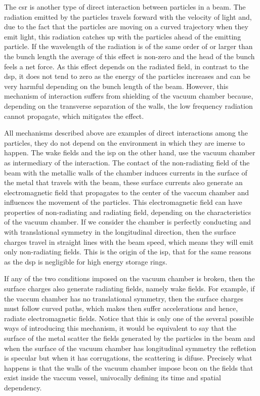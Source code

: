 \documentclass[
	12pt,				%
	openright,			%
	oneside,			%
	a4paper,		%
	chapter=TITLE,		%
	section=TITLE,		%
    brazil,				%
	english,			%
	sumario=tradicional,
	]{abntex2}
\begin{document}
  The \gls{csr} is another type of direct interaction between particles in a beam. The radiation emitted by the particles travels forward with the velocity of light and, due to the fact that the particles are moving on a curved trajectory when they emit light, this radiation catches up with the particles ahead of the emitting particle. If the wavelength of the radiation is of the same order of or larger than the bunch length the average of this effect is non-zero and the head of the bunch feels a net force. As this effect depends on the radiated field, in contrast to the \gls{dsp}, it does not tend to zero as the energy of the particles increases and can be very harmful depending on the bunch length of the beam. However, this mechanism of interaction suffers from shielding of the vacuum chamber because, depending on the transverse separation of the walls, the low frequency radiation cannot propagate, which mitigates the effect.

  All mechanisms described above are examples of direct interactions among the particles, they do not depend on the environment in which they are imerse to happen. The wake fields and the \gls{isp} on the other hand, use the vacuum chamber as intermediary of the interaction. The contact of the non-radiating field of the beam with the metallic walls of the chamber induces currents in the surface of the metal that travels with the beam, these surface currents also generate an electromagnetic field that propagates to the center of the vaccum chamber and influences the movement of the particles. This electromagnetic field can have properties of non-radiating and radiating field, depending on the characteristics of the vacuum chamber. If we consider the chamber is perfectly conducting and with translational symmetry in the longitudinal direction, then the surface charges travel in straight lines with the beam speed, which means they will emit only non-radiating fields. This is the origin of the \gls{isp}, that for the same reasons as the \gls{dsp} is negligible for high energy storage rings.

  If any of the two conditions imposed on the vacuum chamber is broken, then the surface charges also generate radiating fields, namely wake fields. For example, if the vaccum chamber has no translational symmetry, then the surface charges must follow curved paths, which makes then suffer accelerations and hence, radiate electromagnetic fields. Notice that this is only one of the several possible ways of introducing this mechanism, it would be equivalent to say that the surface of the metal scatter the fields generated by the particles in the beam and when the surface of the vacuum chamber has longitudinal symmetry the refletion is specular but when it has corrugations, the scattering is difuse. Precisely what happens is that the walls of the vacuum chamber impose \gls{bcon} on the fields that exist inside the vaccum vessel, univocally defining its time and spatial dependency.
\end{document}
